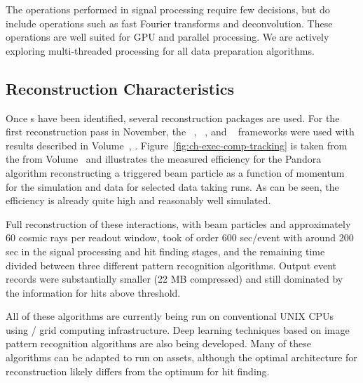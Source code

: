 The operations performed in signal processing require few decisions, but do include operations such as fast Fourier transforms and deconvolution.  These operations are well suited for GPU and parallel processing. We are actively exploring multi-threaded processing for all data preparation algorithms. 


\subsection{Reconstruction Characteristics}



Once s have been identified, several \threed  reconstruction packages are used. For the first reconstruction pass in November, the  ~\cite{Acciarri:2017hat}, ~\cite{wirecell}, and ~\cite{ref:PMA}  frameworks were used with results described in Volume~\volnumberphysics{}, \voltitlephysics{}. 
Figure~\ref{fig:ch-exec-comp-tracking}  is taken from the from Volume~\volnumberphysics{} and illustrates the measured efficiency for the Pandora algorithm reconstructing a triggered beam particle as a function of momentum for the simulation and data for selected data taking runs. As can be seen, the efficiency is already quite high and reasonably well simulated.




Full reconstruction of these  interactions, with beam particles and approximately 60 cosmic rays per readout window, took of order 600 sec/event with around 200 sec in the signal processing and hit finding stages, and the remaining time divided between three different pattern recognition algorithms. Output event records were substantially smaller (22 MB compressed) and still dominated by the information for  hits above threshold. 

All of these algorithms are currently being run on conventional UNIX CPUs using / grid computing  infrastructure. Deep learning techniques based on image pattern recognition algorithms are also being developed. Many of these algorithms can be adapted to run on  assets, although the optimal architecture for \threed reconstruction likely differs from the optimum for hit finding.


